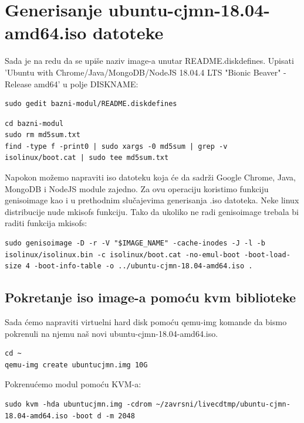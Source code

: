\documentclass[12pt,vi]{mitthesis}
\begin{document}
\section*{Generisanje ubuntu-cjmn-18.04-amd64.iso datoteke}
\indent
Sada je na redu da se upiše naziv image-a unutar README.diskdefines. 
Upisati 'Ubuntu with Chrome/Java/MongoDB/NodeJS 18.04.4 LTS "Bionic Beaver" - Release amd64' u polje DISKNAME:
\begin{lstlisting}[style=BashInputStyle]
sudo gedit bazni-modul/README.diskdefines
\end{lstlisting}

\begin{lstlisting}[style=BashInputStyle]
cd bazni-modul
sudo rm md5sum.txt
find -type f -print0 | sudo xargs -0 md5sum | grep -v isolinux/boot.cat | sudo tee md5sum.txt
\end{lstlisting}

\noindent
Napokon možemo napraviti iso datoteku koja će da sadrži Google Chrome, Java, MongoDB i NodeJS module zajedno. Za ovu operaciju koristimo funkciju genisoimage kao i u prethodnim slučajevima generisanja .iso datoteka. Neke linux distribucije nude mkisofs funkciju. Tako da ukoliko ne radi genisoimage trebala bi raditi funkcija mkisofs:
\begin{lstlisting}[style=BashInputStyle]
sudo genisoimage -D -r -V "$IMAGE_NAME" -cache-inodes -J -l -b isolinux/isolinux.bin -c isolinux/boot.cat -no-emul-boot -boot-load-size 4 -boot-info-table -o ../ubuntu-cjmn-18.04-amd64.iso .
\end{lstlisting}

\subsection*{Pokretanje iso image-a pomoću kvm biblioteke}
\indent
Sada ćemo napraviti virtuelni hard disk pomoću qemu-img komande da bismo pokrenuli na njemu naš novi ubuntu-cjmn-18.04-amd64.iso.
\begin{lstlisting}[style=BashInputStyle]
cd ~
qemu-img create ubuntucjmn.img 10G
\end{lstlisting}

\noindent 
Pokrenućemo modul pomoću KVM-a:
\begin{lstlisting}[style=BashInputStyle]
sudo kvm -hda ubuntucjmn.img -cdrom ~/zavrsni/livecdtmp/ubuntu-cjmn-18.04-amd64.iso -boot d -m 2048
\end{lstlisting}
\end{document}
